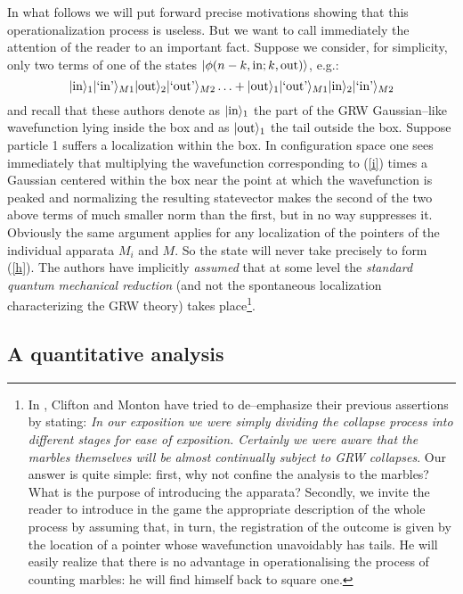 \documentclass[12pt]{article}
\begin{document}
In what follows we will put forward precise motivations showing
that this operationalization process is useless. But we want to
call immediately the attention of the reader to an important fact.
Suppose we consider, for simplicity, only two terms of one of the
states $|\phi (n-k,\makebox{in};k,\makebox{out})\rangle$, e.g.:
\begin{equation} \label{i}
|\makebox{in}\rangle_{1} |\makebox{`in'}\rangle_{M1}
|\makebox{out}\rangle_{2} |\makebox{`out'}\rangle_{M2} \ldots +
|\makebox{out}\rangle_{1} |\makebox{`out'}\rangle_{M1}
|\makebox{in}\rangle_{2} |\makebox{`in'}\rangle_{M2}
\end{equation}
and recall that these authors denote as $|\makebox{in}\rangle_{1}$
the part of the GRW Gaussian--like wavefunction lying inside the
box and as $|\makebox{out}\rangle_{1}$ the tail outside the box.
Suppose particle 1 suffers a localization within the box. In
configuration space one sees immediately that multiplying the
wavefunction corresponding to (\ref{i}) times a Gaussian centered
within the box near the point at which the wavefunction is peaked
and normalizing the resulting statevector makes the second of the
two above terms of much smaller norm than the first, but in no way
suppresses it. Obviously the same argument applies for any
localization of the pointers of the individual apparata $M_{i}$
and $M$. So the state will never take precisely to form (\ref{h}).
The authors have implicitly {\it assumed} that at some level the
{\it standard quantum mechanical reduction} (and not the
spontaneous localization characterizing the GRW theory) takes
place\footnote{In \cite{cli2}, Clifton and Monton have tried to
de--emphasize their previous assertions by stating: {\it In our
exposition we were simply dividing the collapse process into
different stages for ease of exposition. Certainly we were aware
that the marbles themselves will be almost continually subject to
GRW collapses}. Our answer is quite simple: first, why not confine
the analysis to the marbles? What is the purpose of introducing
the apparata? Secondly, we invite the reader to introduce in the
game the appropriate description of the whole process by assuming
that, in turn, the registration of the outcome is given by the
location of a pointer whose wavefunction unavoidably has tails. He
will easily realize that there is no advantage in operationalising
the process of counting marbles: he will find himself back to
square one.}.

\subsection{A quantitative analysis} \label{sec133}
\end{document}
